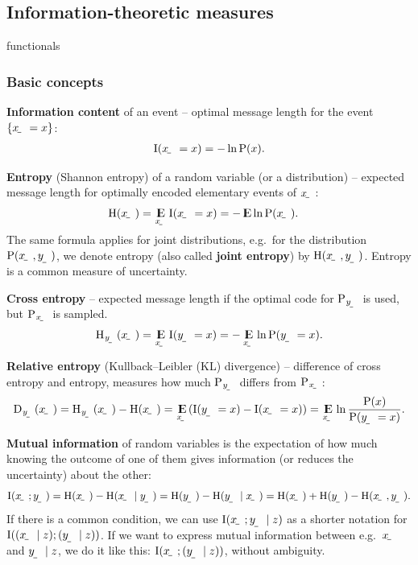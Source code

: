 \documentclass{article}
\begin{document}
\subsection{Information-theoretic measures}

functionals

\subsubsection{Basic concepts}

\textbf{Information content} of an event -- optimal message length for the event $\event{\rvar x=x}$:
\begin{align}
\I(\rvar x=x) = -\ln\P(x) \text.
\end{align}

\textbf{Entropy} (Shannon entropy) of a random variable (or a distribution) -- expected message length for optimally encoded elementary events of $\rvar x$:
\begin{align}
    \H(\rvar x) &= \E_{\rvar x}\I(\rvar x=x) = -\E\ln\P(\rvar x) \text.
\end{align}
The same formula applies for joint distributions, e.g.\ for the distribution $\P(\rvar x,\rvar y)$, we denote entropy (also called \textbf{joint entropy}) by $\H(\rvar x,\rvar y)$. Entropy is a common measure of uncertainty.

\textbf{Cross entropy} -- expected message length if the optimal code for $\P_\rvar{y}$ is used, but $\P_\rvar{x}$ is sampled.
\begin{align}
    \H_\rvar{y}(\rvar x) = \E_{\rvar x}\I(\rvar y=x) = -\E_{\rvar x}\ln\P(\rvar y=x) \text.
\end{align}

\textbf{Relative entropy} (Kullback–Leibler (KL) divergence) -- difference of cross entropy and entropy, measures how much $\P_\rvar{y}$ differs from $\P_\rvar{x}$:
\begin{align}
    \Dist_\rvar{y}(\rvar x) = \H_\rvar{y}(\rvar x) - \H(\rvar x) = \E_\rvar{x}\del{\I(\rvar y=x)-\I(\rvar x=x)} = \E_\rvar{x}\ln\frac{\P(x)}{\P(\rvar y=x)} \text.
\end{align}

\textbf{Mutual information} of random variables is the expectation of how much knowing the outcome of one of them gives information (or reduces the uncertainty) about the other:
\begin{align}
    \I(\rvar x; \rvar y) = \H(\rvar x) - \H(\rvar x\mid\rvar y) = \H(\rvar y) - \H(\rvar y\mid\rvar x) = \H(\rvar x) +\H(\rvar y) - \H(\rvar x, \rvar y) \text.
\end{align}
If there is a common condition, we can use $\I\del{\rvar x; \rvar y\mid z}$ as a shorter notation for $\I\del{(\rvar x\mid z); (\rvar y\mid z)}$. If we want to express mutual information between e.g.\ $\rvar x$ and $\rvar y\mid z$, we do it like this: $\I(\rvar x;(\rvar y\mid z))$, without ambiguity.
\end{document}
